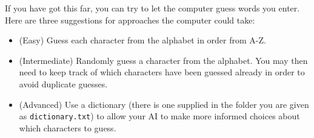 If you have got this far, you can try to let the computer guess words you enter. Here are three suggestions for approaches the computer could take:
\begin{itemize}
	\item (Easy) Guess each character from the alphabet in order from A-Z.
	\item (Intermediate) Randomly guess a character from the alphabet. You may then need to keep track of which characters have been guessed already in order to avoid duplicate guesses.
	\item (Advanced) Use a dictionary (there is one supplied in the folder you are given as \texttt{dictionary.txt}) to allow your AI to make more informed choices about which characters to guess. 
\end{itemize}
